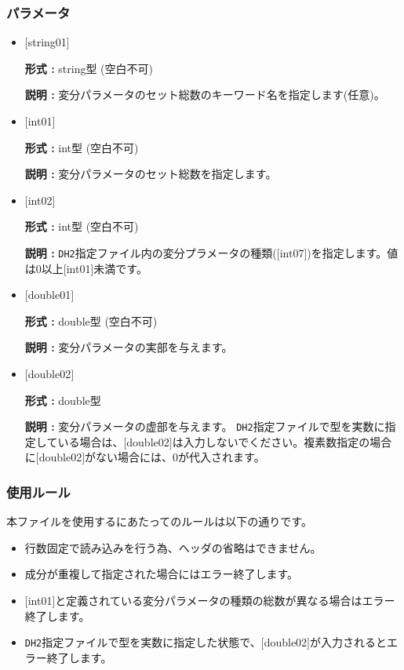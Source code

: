 \subsubsection{パラメータ}
 \begin{itemize}

   \item  $[$string01$]$
   
    {\bf 形式 :} string型 (空白不可)

   {\bf 説明 :} 変分パラメータのセット総数のキーワード名を指定します(任意)。

   \item  $[$int01$]$
   
    {\bf 形式 :} int型 (空白不可)

   {\bf 説明 :} 変分パラメータのセット総数を指定します。

 \item  $[$int02$]$
   
   {\bf 形式 :} int型 (空白不可)

  {\bf 説明 :} \verb|DH2|指定ファイル内の変分プラメータの種類([int07])を指定します。値は0以上[int01]{未満}です。

 \item  $[$double01$]$
    
   {\bf 形式 :} double型 (空白不可)

  {\bf 説明 :} 変分パラメータの実部を与えます。
  
 
 \item $[$double02$]$
   
   {\bf 形式 :} double型

  {\bf 説明 :} 変分パラメータの虚部を与えます。 \verb|DH2|指定ファイルで型を実数に指定している場合は、$[$double02$]$は入力しないでください。複素数指定の場合に$[$double02$]$がない場合には、0が代入されます。
  
\end{itemize}

\subsubsection{使用ルール}
本ファイルを使用するにあたってのルールは以下の通りです。
\begin{itemize}
\item 行数固定で読み込みを行う為、ヘッダの省略はできません。
\item 成分が重複して指定された場合にはエラー終了します。
\item $[$int01$]$と定義されている変分パラメータの種類の総数が異なる場合はエラー終了します。
\item \verb|DH2|指定ファイルで型を実数に指定した状態で、$[$double02$]$が入力されるとエラー終了します。
\end{itemize}


